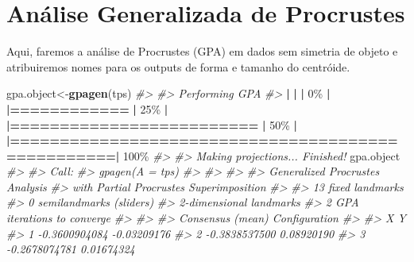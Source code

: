 \documentclass[
]{book}
\newenvironment{Shaded}{\begin{snugshade}}{\end{snugshade}}
\newcommand{\CommentTok}[1]{\textcolor[rgb]{0.56,0.35,0.01}{\textit{#1}}}
\newcommand{\DecValTok}[1]{\textcolor[rgb]{0.00,0.00,0.81}{#1}}
\newcommand{\ErrorTok}[1]{\textcolor[rgb]{0.64,0.00,0.00}{\textbf{#1}}}
\newcommand{\FunctionTok}[1]{\textcolor[rgb]{0.13,0.29,0.53}{\textbf{#1}}}
\newcommand{\NormalTok}[1]{#1}
\newcommand{\OtherTok}[1]{\textcolor[rgb]{0.56,0.35,0.01}{#1}}
\newcommand{\SpecialCharTok}[1]{\textcolor[rgb]{0.81,0.36,0.00}{\textbf{#1}}}
\begin{document}
\section{Análise Generalizada de Procrustes}\label{anuxe1lise-generalizada-de-procrustes}

Aqui, faremos a análise de Procrustes (GPA) em dados sem simetria de objeto e atribuiremos nomes para os outputs de forma e tamanho do centróide.

\begin{Shaded}
\begin{Highlighting}[]
\NormalTok{gpa.object}\OtherTok{\textless{}{-}}\FunctionTok{gpagen}\NormalTok{(tps)}
\CommentTok{\#\textgreater{} }
\CommentTok{\#\textgreater{} Performing GPA}
\CommentTok{\#\textgreater{} }
  \SpecialCharTok{|}                                                        
  \ErrorTok{|}                                                  \ErrorTok{|}   \DecValTok{0}\NormalTok{\%}
  \SpecialCharTok{|}                                                        
  \ErrorTok{|============}                                      \ErrorTok{|}  \DecValTok{25}\NormalTok{\%}
  \SpecialCharTok{|}                                                        
  \ErrorTok{|=========================}                         \ErrorTok{|}  \DecValTok{50}\NormalTok{\%}
  \SpecialCharTok{|}                                                        
  \ErrorTok{|==================================================|} \DecValTok{100}\NormalTok{\%}
\CommentTok{\#\textgreater{} }
\CommentTok{\#\textgreater{} Making projections... Finished!}
\NormalTok{gpa.object}
\CommentTok{\#\textgreater{} }
\CommentTok{\#\textgreater{} Call:}
\CommentTok{\#\textgreater{} gpagen(A = tps) }
\CommentTok{\#\textgreater{} }
\CommentTok{\#\textgreater{} }
\CommentTok{\#\textgreater{} }
\CommentTok{\#\textgreater{} Generalized Procrustes Analysis}
\CommentTok{\#\textgreater{} with Partial Procrustes Superimposition}
\CommentTok{\#\textgreater{} }
\CommentTok{\#\textgreater{} 13 fixed landmarks}
\CommentTok{\#\textgreater{} 0 semilandmarks (sliders)}
\CommentTok{\#\textgreater{} 2{-}dimensional landmarks}
\CommentTok{\#\textgreater{} 2 GPA iterations to converge}
\CommentTok{\#\textgreater{} }
\CommentTok{\#\textgreater{} }
\CommentTok{\#\textgreater{} Consensus (mean) Configuration}
\CommentTok{\#\textgreater{} }
\CommentTok{\#\textgreater{}                X           Y}
\CommentTok{\#\textgreater{} 1  {-}0.3600904084 {-}0.03209176}
\CommentTok{\#\textgreater{} 2  {-}0.3838537500  0.08920190}
\CommentTok{\#\textgreater{} 3  {-}0.2678074781  0.01674324}

\end{Highlighting}
\end{Shaded}
\end{document}
